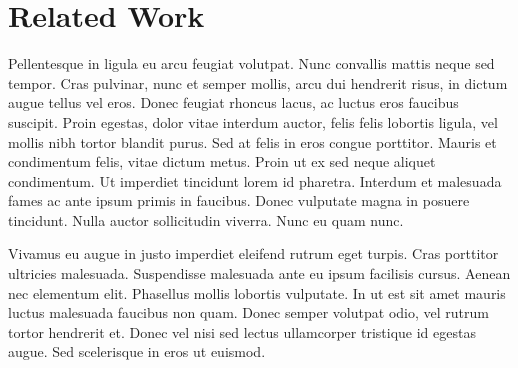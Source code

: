\section{Related Work}%
\label{sec:related-work}
Pellentesque in ligula eu arcu feugiat volutpat. Nunc convallis mattis neque sed tempor. Cras pulvinar, nunc et semper mollis, arcu dui hendrerit risus, in dictum augue tellus vel eros. Donec feugiat rhoncus lacus, ac luctus eros faucibus suscipit. Proin egestas, dolor vitae interdum auctor, felis felis lobortis ligula, vel mollis nibh tortor blandit purus. Sed at felis in eros congue porttitor. Mauris et condimentum felis, vitae dictum metus. Proin ut ex sed neque aliquet condimentum. Ut imperdiet tincidunt lorem id pharetra. Interdum et malesuada fames ac ante ipsum primis in faucibus. Donec vulputate magna in posuere tincidunt. Nulla auctor sollicitudin viverra. Nunc eu quam nunc.

Vivamus eu augue in justo imperdiet eleifend rutrum eget turpis. Cras porttitor ultricies malesuada. Suspendisse malesuada ante eu ipsum facilisis cursus. Aenean nec elementum elit. Phasellus mollis lobortis vulputate. In ut est sit amet mauris luctus malesuada faucibus non quam. Donec semper volutpat odio, vel rutrum tortor hendrerit et. Donec vel nisi sed lectus ullamcorper tristique id egestas augue. Sed scelerisque in eros ut euismod.